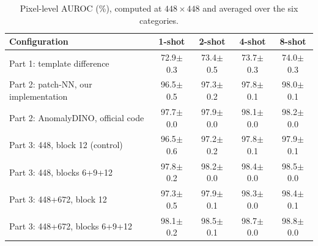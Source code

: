 \begin{table}[t]
\centering
\small
\setlength{\tabcolsep}{9pt}
\begin{tabular}{lcccc}
\toprule
Configuration & 1-shot & 2-shot & 4-shot & 8-shot \\
\midrule
Part 1: template difference & 72.9$\pm$0.3 & 73.4$\pm$0.5 & 73.7$\pm$0.3 & 74.0$\pm$0.3 \\
Part 2: patch-NN, our implementation & 96.5$\pm$0.5 & 97.3$\pm$0.2 & 97.8$\pm$0.1 & 98.0$\pm$0.1 \\
Part 2: AnomalyDINO, official code & 97.7$\pm$0.0 & 97.9$\pm$0.0 & 98.1$\pm$0.0 & 98.2$\pm$0.0 \\
\midrule
Part 3: 448, block 12 (control) & 96.5$\pm$0.6 & 97.2$\pm$0.2 & 97.8$\pm$0.1 & 97.9$\pm$0.1 \\
Part 3: 448, blocks 6+9+12 & 97.8$\pm$0.2 & 98.2$\pm$0.0 & 98.4$\pm$0.0 & 98.5$\pm$0.0 \\
Part 3: 448+672, block 12 & 97.3$\pm$0.5 & 97.9$\pm$0.1 & 98.3$\pm$0.0 & 98.4$\pm$0.1 \\
Part 3: 448+672, blocks 6+9+12 & 98.1$\pm$0.2 & 98.5$\pm$0.1 & 98.7$\pm$0.0 & 98.8$\pm$0.0 \\
\bottomrule
\end{tabular}
\caption{Pixel-level AUROC (\%), computed at $448\times448$ and averaged over the six categories.}
\label{tab:pixel}
\end{table}